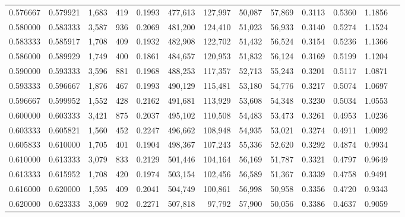 \begin{tabular}{rrrrrrrrrrrrr}
0.576667 & 0.579921 &  1,683 &   419 &                                     0.1993 & 477,613 & 127,997 &  50,087 &  57,869 & 0.3113 & 0.5360 & 1.1856 \\
0.580000 & 0.583333 &  3,587 &   936 &                                     0.2069 & 481,200 & 124,410 &  51,023 &  56,933 & 0.3140 & 0.5274 & 1.1524 \\
0.583333 & 0.585917 &  1,708 &   409 &                                     0.1932 & 482,908 & 122,702 &  51,432 &  56,524 & 0.3154 & 0.5236 & 1.1366 \\
0.586000 & 0.589929 &  1,749 &   400 &                                     0.1861 & 484,657 & 120,953 &  51,832 &  56,124 & 0.3169 & 0.5199 & 1.1204 \\
0.590000 & 0.593333 &  3,596 &   881 &                                     0.1968 & 488,253 & 117,357 &  52,713 &  55,243 & 0.3201 & 0.5117 & 1.0871 \\
0.593333 & 0.596667 &  1,876 &   467 &                                     0.1993 & 490,129 & 115,481 &  53,180 &  54,776 & 0.3217 & 0.5074 & 1.0697 \\
0.596667 & 0.599952 &  1,552 &   428 &                                     0.2162 & 491,681 & 113,929 &  53,608 &  54,348 & 0.3230 & 0.5034 & 1.0553 \\
0.600000 & 0.603333 &  3,421 &   875 &                                     0.2037 & 495,102 & 110,508 &  54,483 &  53,473 & 0.3261 & 0.4953 & 1.0236 \\
0.603333 & 0.605821 &  1,560 &   452 &                                     0.2247 & 496,662 & 108,948 &  54,935 &  53,021 & 0.3274 & 0.4911 & 1.0092 \\
0.605833 & 0.610000 &  1,705 &   401 &                                     0.1904 & 498,367 & 107,243 &  55,336 &  52,620 & 0.3292 & 0.4874 & 0.9934 \\
0.610000 & 0.613333 &  3,079 &   833 &                                     0.2129 & 501,446 & 104,164 &  56,169 &  51,787 & 0.3321 & 0.4797 & 0.9649 \\
0.613333 & 0.615952 &  1,708 &   420 &                                     0.1974 & 503,154 & 102,456 &  56,589 &  51,367 & 0.3339 & 0.4758 & 0.9491 \\
0.616000 & 0.620000 &  1,595 &   409 &                                     0.2041 & 504,749 & 100,861 &  56,998 &  50,958 & 0.3356 & 0.4720 & 0.9343 \\
0.620000 & 0.623333 &  3,069 &   902 &                                     0.2271 & 507,818 &  97,792 &  57,900 &  50,056 & 0.3386 & 0.4637 & 0.9059 \\

\end{tabular}
